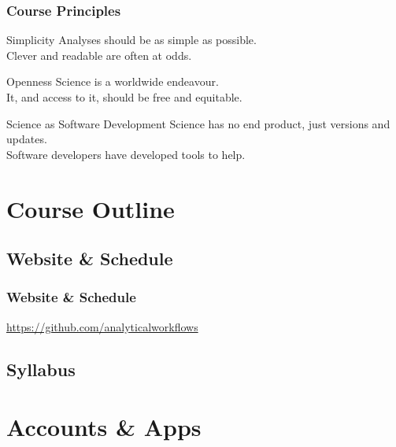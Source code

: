 \documentclass{beamer}
\begin{document}
\begin{frame}

    \frametitle{Course Principles}

        \begin{block}{Simplicity}
            Analyses should be as simple as possible.\\Clever and readable are often at odds.
        \end{block}
        
        \begin{block}{Openness}
            Science is a worldwide endeavour.\\It, and access to it, should be free and equitable.
        \end{block}
    
        \begin{block}{Science as Software Development}
            Science has no end product, just versions and updates.\\Software developers have developed tools to help.
        \end{block}

\end{frame}

\section{Course Outline}


\subsection{Website \& Schedule}

\begin{frame}
    \frametitle{Website \& Schedule}
    \url{https://github.com/analyticalworkflows}

\end{frame}


\subsection{Syllabus}


\section{Accounts \& Apps}
\end{document}
